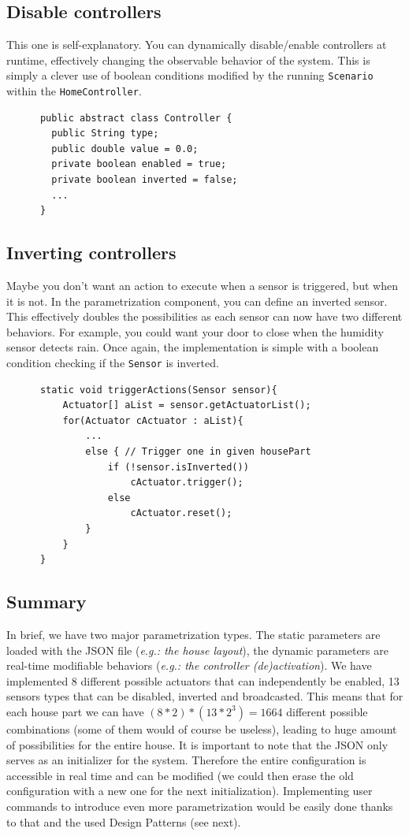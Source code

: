     \subsection{Disable controllers}
      This one is self-explanatory. You can dynamically disable/enable controllers at runtime, effectively changing the observable behavior of the system. This is simply a clever use of boolean conditions modified by the running \texttt{Scenario} within the \texttt{HomeController}.
      \begin{verbatim}
      public abstract class Controller {
        public String type;
        public double value = 0.0;
        private boolean enabled = true;
        private boolean inverted = false;
        ...
      }
      \end{verbatim}

    \subsection{Inverting controllers}
      Maybe you don't want an action to execute when a sensor is triggered, but when it is not. In the parametrization component, you can define an inverted sensor. This effectively doubles the possibilities as each sensor can now have two different behaviors. For example, you could want your door to close when the humidity sensor detects rain. Once again, the implementation is simple with a boolean condition checking if the \texttt{Sensor} is inverted.
      \begin{verbatim}
      static void triggerActions(Sensor sensor){
          Actuator[] aList = sensor.getActuatorList();
          for(Actuator cActuator : aList){
              ...
              else { // Trigger one in given housePart
                  if (!sensor.isInverted())
                      cActuator.trigger();
                  else
                      cActuator.reset();
              }
          }
      }
      \end{verbatim}

    \subsection{Summary}
      In brief, we have two major parametrization types. The static parameters are loaded with the JSON file (\emph{e.g.: the house layout}), the dynamic parameters are real-time modifiable behaviors (\emph{e.g.: the controller (de)activation}).
      We have implemented 8 different possible actuators that can independently be enabled, 13 sensors types that can be disabled, inverted and broadcasted. This means that for each house part we can have $(8*2)*(13*2^3)=1664$ different possible combinations (some of them would of course be useless), leading to huge amount of possibilities for the entire house.
      It is important to note that the JSON only serves as an initializer for the system. Therefore the entire configuration is accessible in real time and can be modified (we could then erase the old configuration with a new one for the next initialization). Implementing user commands to introduce even more parametrization would be easily done thanks to that and the used Design Patterns (see next).

